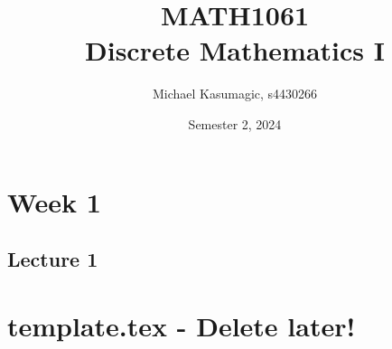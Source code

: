 \documentclass{report}
\title{\Huge{MATH1061}\\Discrete Mathematics I}
\author{\huge{Michael Kasumagic, s4430266}}
\date{\huge{Semester 2, 2024}}
\begin{document}
\maketitle
\newpage%
\tableofcontents
\pagebreak

\chapter{Week 1}
\section{Lecture 1}





















\pagebreak
\chapter{template.tex - Delete later!}
\end{document}
